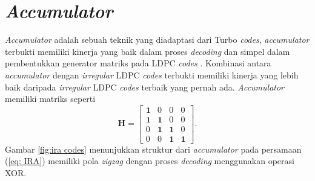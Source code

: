 \section{\textit{Accumulator} }
\textit{Accumulator} adalah sebuah teknik yang diadaptasi dari Turbo \textit{codes}, \textit{accumulator} terbukti memiliki kinerja yang baik dalam proses \textit{decoding} dan simpel dalam  pembentukkan generator matriks pada LDPC \textit{codes} \cite{IRA}. Kombinasi antara \textit{accumulator} dengan \textit{irregular} LDPC \textit{codes} terbukti memiliki kinerja yang lebih baik daripada \textit{irregular} LDPC \textit{codes} terbaik yang pernah ada. \textit{Accumulator} memiliki matriks seperti
\begin{equation}
\mathbf{H}= \begin{bmatrix} 
 \textbf{1} & 0 & 0 & 0  \\ 
 \textbf{1} & \textbf{1} & 0 & 0  \\ 
0 & \textbf{1} & \textbf{1} & 0  \\ 
 0 & 0 & \textbf{1} & \textbf{1} 
\end{bmatrix}.
\label{eq: IRA}
\end{equation} 
Gambar \ref{fig:ira codes} menunjukkan struktur dari \textit{accumulator} pada persamaan (\ref{eq: IRA}) memiliki pola \textit{zigzag} dengan proses \textit{decoding} menggunakan operasi XOR.
